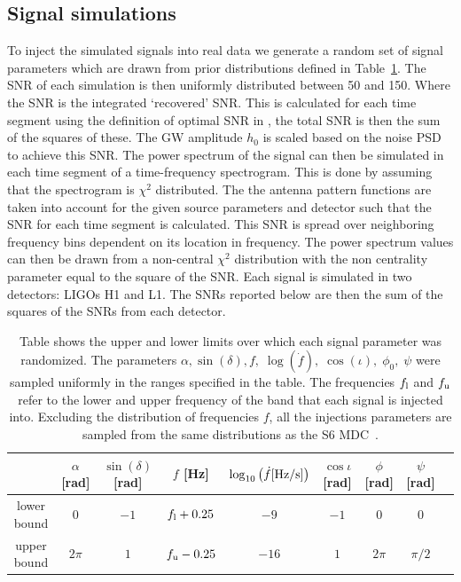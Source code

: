 \subsection{\label{data:injections} Signal simulations}

%
To inject the simulated signals into real data we generate a random set of signal
parameters which are drawn from prior distributions defined in
Table~\ref{data:injections:table}. The \ac{SNR} of each simulation is then uniformly distributed between 50 and 150. Where the \ac{SNR} is the integrated `recovered' \ac{SNR}. This is calculated for each time segment using the definition of optimal \ac{SNR} in \cite{prix2007SearchContinuous}, the total \ac{SNR} is then the sum of the squares of these.
The \ac{GW} amplitude $h_{0}$ is scaled based on the noise \ac{PSD} to achieve this \ac{SNR}. 
The power spectrum of the signal can then be simulated in each time segment of a time-frequency spectrogram. This is done by assuming that the spectrogram is $\chi^2$ distributed.
The the antenna pattern functions are taken into account for the given source parameters and detector such that the \ac{SNR} for each time segment is calculated.
This \ac{SNR} is spread over neighboring frequency bins dependent on its location in frequency.
The power spectrum values can then be drawn from a non-central $\chi^2$ distribution with the non centrality parameter equal to the square of the \ac{SNR}.
Each signal is simulated in two detectors: \acp{LIGO} H1 and L1.
The \acp{SNR} reported below are then the sum of the squares of the \acp{SNR} from each detector.


%
\begin{table}
	\caption{\label{data:injections:table} Table shows the upper and lower limits
		over which each signal parameter was randomized. The parameters $\alpha,\sin{\left(\delta \right)},f,\;\log{\left( \dot{f} \right)},\; \cos{\left(\iota
			\right)},\; \phi_0,\; \psi$ were sampled
		uniformly in the ranges specified in the table. The frequencies $f_{\rm l}$ and $f_{\rm u}$
		refer to the lower and upper frequency of the band that each signal is injected
		into. Excluding the distribution of frequencies $f$, all the injections parameters are sampled from the same distributions as the S6
		\ac{MDC}~\cite{walsh2016ComparisonMethods}.}
	\bgroup
	\def\arraystretch{1.5}
	\centering
	\begin{tabular}{c c c c c c c c r|}
		\hline
		\hline
		& $\alpha$ [rad]& $\sin\left(\delta \right)$ [rad] & $f$ [Hz]&
		$\log_{10}\left(\dot{f} [\rm{Hz/s}]\right)$ & $\cos{\iota}$ [rad]& $\phi$ [rad]& $\psi$ [rad]\\
		\hline
		lower bound & $0$ & $-1$ & $f_{\rm l} + 0.25$ & $-9$ & $-1$ & $0$ & $0$ \\
		\hline
		upper bound & $2\pi$ & $1$ & $f_{\rm u} - 0.25$ & $-16$ & $1$ & $2\pi$ & $\pi/2$ \\
		\hline
	\end{tabular}
	\egroup
\end{table}

